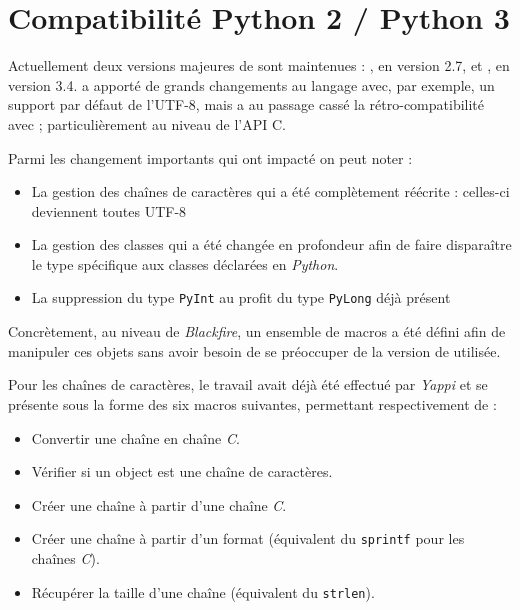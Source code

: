 \chapter{Compatibilité Python 2 / Python 3}
  \label{app:compat-py3}
  \label{app:compat-23}
Actuellement deux versions majeures de \Python sont maintenues : , en version 2.7, et , en version 3.4.  a apporté de grands changements au langage avec, par exemple, un support par défaut de l'UTF-8, mais a au passage cassé la rétro-compatibilité avec  ; particulièrement au niveau de l'API C.

Parmi les changement importants qui ont impacté \Blackfire on peut noter :
\begin{itemize}
\item La gestion des chaînes de caractères qui a été complètement réécrite : celles-ci deviennent toutes UTF-8
\item La gestion des classes qui a été changée en profondeur afin de faire disparaître le type spécifique aux classes déclarées en \emph{Python}.
\item La suppression du type \verb|PyInt| au profit du type \verb|PyLong| déjà présent
\end{itemize}

Concrètement, au niveau de \emph{Blackfire}, un ensemble de macros a été défini afin de manipuler ces objets sans avoir besoin de se préoccuper de la version de \Python utilisée.

Pour les chaînes de caractères, le travail avait déjà été effectué par \emph{Yappi} et se présente sous la forme des six macros suivantes, permettant respectivement de :
\begin{itemize}
\item Convertir une chaîne \Python en chaîne \emph{C}.
\item Vérifier si un object \Python est une chaîne de caractères.
\item Créer une chaîne \Python à partir d'une chaîne \emph{C}.
\item Créer une chaîne \Python à partir d'un format (équivalent du \verb|sprintf| pour les chaînes \emph{C}).
\item Récupérer la taille d'une chaîne \Python (équivalent du \verb|strlen|).
\end{itemize}

